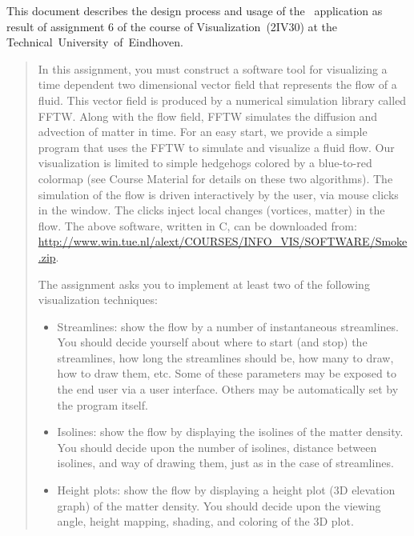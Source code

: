 
This document describes the design process and usage of the \fluids\
application as result of assignment 6 of the course of Visualization~(2IV30) at
the Technical~University~of~Eindhoven.

\begin{quote}

In this assignment, you must construct a software tool for visualizing a time
dependent two dimensional vector field that represents the flow of a fluid.
This vector field is produced by a numerical simulation library called FFTW.
Along with the flow field, FFTW simulates the diffusion and advection of matter
in time. For an easy start, we provide a simple program that uses the FFTW to
simulate and visualize a fluid flow. Our visualization is limited to simple
hedgehogs colored by a blue-to-red colormap (see Course Material for details on
these two algorithms). The simulation of the flow is driven interactively by
the user, via mouse clicks in the window. The clicks inject local changes
(vortices, matter) in the flow.  The above software, written in C, can be
downloaded from:
\url{http://www.win.tue.nl/alext/COURSES/INFO_VIS/SOFTWARE/Smoke.zip}.

The assignment asks you to implement at least two of the following
visualization techniques: 

\begin{itemize} 

  \item Streamlines: show the flow by a number of instantaneous streamlines.
  You should decide yourself about where to start (and stop) the streamlines,
  how long the streamlines should be, how many to draw, how to draw them,
  etc. Some of these parameters may be exposed to the end user via a user
  interface. Others may be automatically set by the program itself. 


  \item Isolines: show the flow by displaying the isolines of the matter
  density. You should decide upon the number of isolines, distance between
  isolines, and way of drawing them, just as in the case of streamlines. 

  \item Height plots: show the flow by displaying a height plot (3D elevation
  graph) of the matter density. You should decide upon the viewing angle,
  height mapping, shading, and coloring of the 3D plot. 

\end{itemize}


\end{quote}
